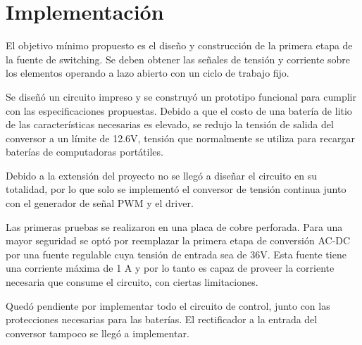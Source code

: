 \section{Implementación}

El objetivo mínimo propuesto es el diseño y construcción de la primera etapa de la fuente de switching. 
Se deben obtener las señales de tensión y corriente sobre los elementos operando a lazo abierto con un ciclo de trabajo fijo. 

Se diseñó un circuito impreso y se construyó un prototipo funcional para cumplir con las especificaciones propuestas. 
Debido a que el costo de una batería de litio de las características necesarias es elevado,
se redujo la tensión de salida del conversor a un límite de 12.6V,
tensión que normalmente se utiliza para recargar baterías de computadoras portátiles.

Debido a la extensión del proyecto no se llegó a diseñar el circuito en su totalidad,
por lo que solo se implementó el conversor de tensión continua
junto con el generador de señal PWM y el driver.

Las primeras pruebas se realizaron en una placa de cobre perforada. 
Para una mayor seguridad se optó por reemplazar la primera etapa de conversión AC-DC por una fuente regulable cuya tensión de entrada sea de 36V.
Esta fuente tiene una corriente máxima de 1 A y por lo tanto es capaz de proveer la corriente necesaria que consume el circuito, con ciertas limitaciones.

Quedó pendiente por implementar todo el circuito de control,
junto con las protecciones necesarias para las baterías.
El rectificador a la entrada del conversor tampoco se llegó a implementar.